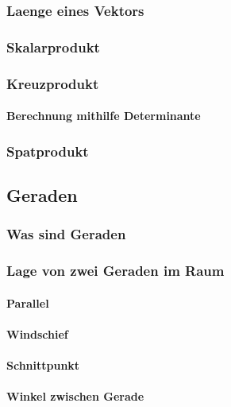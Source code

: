\documentclass[a4paper]{article} %
\begin{document}
	\subsubsection{Laenge eines Vektors}
	\subsubsection{Skalarprodukt}
	\subsubsection{Kreuzprodukt}
	\paragraph{Berechnung mithilfe Determinante}
	\subsubsection{Spatprodukt}
	\subsection{Geraden}
	\subsubsection{Was sind Geraden}
	\subsubsection{Lage von zwei Geraden im Raum}
	\paragraph{Parallel}
	\paragraph{Windschief}
	\paragraph{Schnittpunkt}
	\paragraph{Winkel zwischen Gerade}
\end{document}
